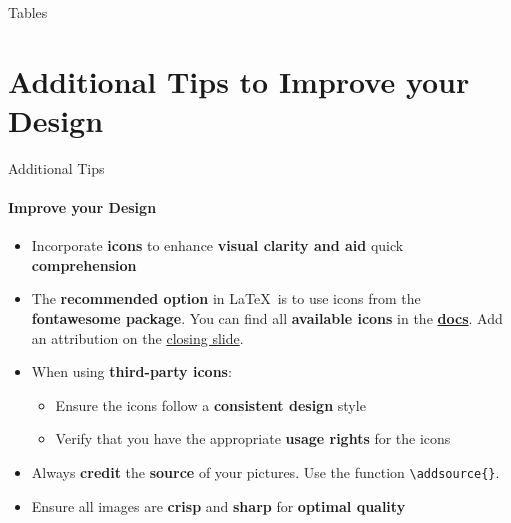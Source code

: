 \documentclass[aspectratio=169]{beamer}
\begin{document}
\begin{frame}{Tables}
    
\end{frame}


\section{Additional \textbf{Tips} to Improve your Design}

\begin{frame}
\end{frame}

\begin{frame}{Additional Tips}
    \framesubtitle{Improve your Design}

    \begin{coloredblock}
        \begin{itemize}
            \item Incorporate \textbf{icons} to enhance \textbf{visual clarity and aid }quick \textbf{comprehension}
            \item The \textbf{recommended option} in \LaTeX~is to use icons from the \textbf{fontawesome package}. You can find all \textbf{available icons} in the \href{https://mirror.easyname.at/ctan/fonts/fontawesome5/doc/fontawesome5.pdf}{\textbf{docs}}. Add an attribution on the \hyperlink{frame:closing_slide}{closing slide}.

            \item When using \textbf{third-party icons}:
            \vspace{-0.5\topsep}
            \begin{itemize}
                \item Ensure the icons follow a \textbf{consistent design} style
                \item Verify that you have the appropriate \textbf{usage rights} for the icons
            \end{itemize}
        \end{itemize}
    \end{coloredblock}

        \begin{coloredblock}
            \begin{itemize}
                \item Always \textbf{credit} the \textbf{source} of your pictures. Use the function \texttt{\textbackslash addsource\{\}}.
                \item Ensure all images are \textbf{crisp} and \textbf{sharp} for \textbf{optimal quality}
            \end{itemize}
        \end{coloredblock}
\end{frame}
\end{document}

